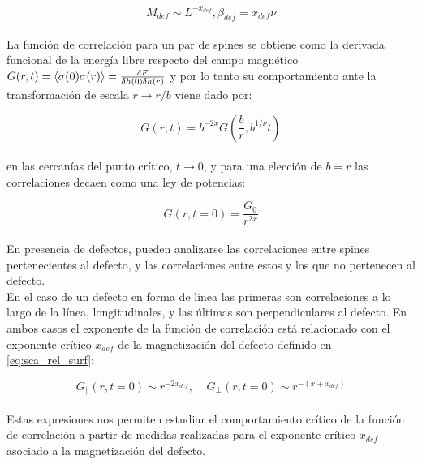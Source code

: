 \begin{equation}
	\label{eq:sca_rel_surf}
	M_{def}\sim L^{-x_{def}}, \beta_{def} =x_{def}\nu
\end{equation}
\\
La funci\'on de correlaci\'on para un par de spines se obtiene como la derivada funcional de la energ\'ia libre respecto del campo magn\'etico 
 $G(r,t)=\langle \sigma(0)\sigma(r) \rangle=\frac{\delta F}{\delta h(0) \delta h(r)}$ y por lo tanto su comportamiento ante la
 transformaci\'on de escala $r\rightarrow r/b$ viene dado por:
 
\begin{equation}
	\label{eq:sca_corr}
	G(r, t)=b^{-2x}G(\frac{b}{r}, b^{1/\nu}t)
\end{equation}
\\
 en las cercan\'ias del punto cr\'itico, $t\rightarrow 0$, y para una elecci\'on de $b=r$ las correlaciones decaen como
 una ley de potencias:

\begin{equation}
	\label{eq:sca_corr_pot}
	G(r, t=0)=\frac{G_{0}}{r^{2x}}
\end{equation}
\\
En presencia de defectos, pueden analizarse las correlaciones entre spines pertenecientes al defecto, y las
 correlaciones entre estos y los que no pertenecen al defecto.\\
En el caso de un defecto en forma de l\'inea las primeras
 son correlaciones a lo largo de la l\'inea, longitudinales, y las \'ultimas son perpendiculares al defecto. En ambos casos
 el exponente de la funci\'on de correlaci\'on est\'a relacionado con el exponente cr\'itico $x_{def}$ de la magnetizaci\'on
 del defecto definido en \ref{eq:sca_rel_surf}:

\begin{equation}
	\label{eq:sca_corr_pot_def}
	G_{\parallel}(r, t=0)\sim{r^{-2x_{def}}}, \; \; \; \;  G_{\perp}(r, t=0)\sim{r^{-(x+x_{def})}}
\end{equation}
\\

Estas expresiones nos permiten estudiar el comportamiento cr\'itico de la funci\'on de correlaci\'on a partir
 de medidas realizadas para el exponente cr\'itico $x_{def}$ asociado a la magnetizaci\'on del defecto.\\
